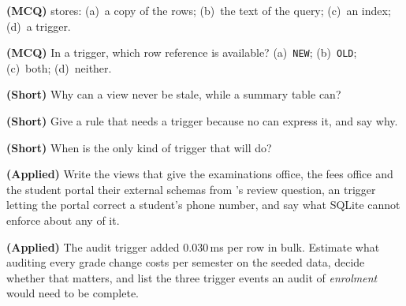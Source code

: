 \begin{reviewq}
  \item \textbf{(MCQ)}  stores: (a)~a copy of the rows;
        (b)~the text of the query; (c)~an index; (d)~a trigger.
  \item \textbf{(MCQ)} In a  trigger, which row reference is
        available? (a)~\texttt{NEW}; (b)~\texttt{OLD}; (c)~both;
        (d)~neither.
  \item \textbf{(Short)} Why can a view never be stale, while a summary table
        can?
  \item \textbf{(Short)} Give a rule that needs a trigger because no
         can express it, and say why.
  \item \textbf{(Short)} When is  the only kind of trigger
        that will do?
  \item \textbf{(Applied)} Write the views that give the examinations office,
        the fees office and the student portal their external schemas from
        's review question, an  trigger
        letting the portal correct a student's phone number, and say what
        SQLite cannot enforce about any of it.
  \item \textbf{(Applied)} The audit trigger added 0.030\,ms per row in bulk.
        Estimate what auditing every grade change costs per semester on the
        seeded data, decide whether that matters, and list the three trigger
        events an audit of \textit{enrolment} would need to be complete.
\end{reviewq}
